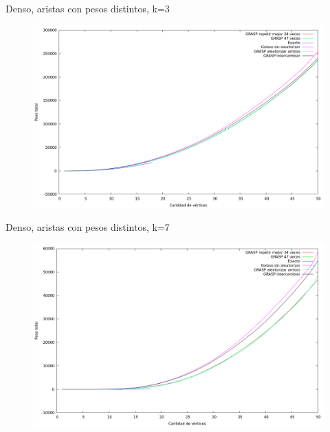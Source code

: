 \vspace*{0.5cm}

Denso, aristas con pesos distintos, k=3
\vspace*{0.5cm}

\begin{figure}[H]
  \begin{center}
    \includegraphics[scale=0.35]{imagenes/ej6-denso-pesos-distintos-k3-peso.png}
  \end{center}
\end{figure}

\vspace*{0.5cm}

Denso, aristas con pesos distintos, k=7
\vspace*{0.5cm}

\begin{figure}[H]
  \begin{center}
    \includegraphics[scale=0.35]{imagenes/ej6-denso-pesos-distintos-k7-peso.png}
  \end{center}
\end{figure}

